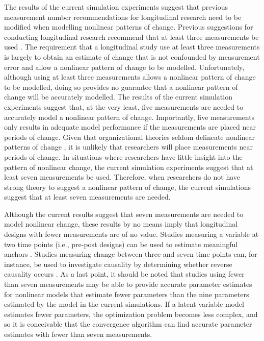 \documentclass[
12pt, %
twoside,
english]{guelphthesis}
\begin{document}
The results of the current simulation experiments suggest that previous measurement number recommendations for longitudinal research need to be modified when modelling nonlinear patterns of change. Previous suggestions for conducting longitudinal research recommend that at least three measurements be used \autocite{chan1998,ployhart2010}. The requirement that a longitudinal study use at least three measurements is largely to obtain an estimate of change that is not confounded by measurement error \autocite{rogosa1982} and allow a nonlinear pattern of change to be modelled. Unfortunately, although using at least three measurements allows a nonlinear pattern of change to be modelled, doing so provides no guarantee that a nonlinear pattern of change will be accurately modelled. The results of the current simulation experiments suggest that, at the very least, five measurements are needed to accurately model a nonlinear pattern of change. Importantly, five measurements only results in adequate model performance if the measurements are placed near periods of change. Given that organizational theories seldom delineate nonlinear patterns of change \autocite[for a rare example, see][]{methot2017}, it is unlikely that researchers will place measurements near periods of change. In situations where researchers have little insight into the pattern of nonlinear change, the current simulation experiments suggest that at least seven measurements be used. Therefore, when researchers do not have strong theory to suggest a nonlinear pattern of change, the current simulations suggest that at least seven measurements are needed.

Although the current results suggest that seven measurements are needed to model nonlinear change, these results by no means imply that longitudinal designs with fewer measurements are of no value. Studies measuring a variable at two time points (i.e., pre-post designs) can be used to estimate meaningful anchors \autocite{anvari2021}. Studies measuring change between three and seven time points can, for instance, be used to investigate causality by determining whether reverse causality occurs \autocite{leszczensky2019}. As a last point, it should be noted that studies using fewer than seven measurements may be able to provide accurate parameter estimates for nonlinear models that estimate fewer parameters than the nine parameters estimated by the model in the current simulations. If a latent variable model estimates fewer parameters, the optimization problem becomes less complex, and so it is conceivable that the convergence algorithm can find accurate parameter estimates with fewer than seven measurements.
\end{document}
